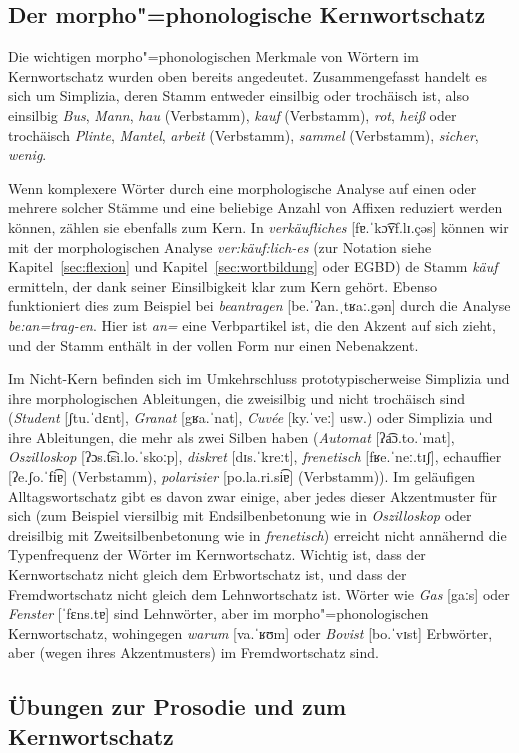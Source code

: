 \subsection{Der morpho"=phonologische Kernwortschatz}

Die wichtigen morpho"=phonologischen Merkmale von Wörtern im Kernwortschatz wurden oben bereits angedeutet.
Zusammengefasst handelt es sich um Simplizia, deren Stamm entweder einsilbig oder trochäisch ist, also einsilbig \textit{Bus}, \textit{Mann}, \textit{hau} (Verbstamm), \textit{kauf} (Verbstamm), \textit{rot}, \textit{heiß} oder trochäisch \textit{Plinte}, \textit{Mantel}, \textit{arbeit} (Verbstamm), \textit{sammel} (Verbstamm), \textit{sicher}, \textit{wenig}.

Wenn komplexere Wörter durch eine morphologische Analyse auf einen oder mehrere solcher Stämme und eine beliebige Anzahl von Affixen reduziert werden können, zählen sie ebenfalls zum Kern.
In \textit{verkäufliches} [fɐ.ˈkɔ͡ʏf.lɪ.çəs] können wir mit der morphologischen Analyse \textit{ver:käuf:lich-es} (zur Notation siehe Kapitel~\ref{sec:flexion} und Kapitel~\ref{sec:wortbildung} oder EGBD) de Stamm \textit{käuf} ermitteln, der dank seiner Einsilbigkeit klar zum Kern gehört.
Ebenso funktioniert dies zum Beispiel bei \textit{beantragen} [be.ˈʔan.ˌtʁaː.gən] durch die Analyse \textit{be:an=trag-en}.
Hier ist \textit{an=} eine Verbpartikel ist, die den Akzent auf sich zieht, und der Stamm enthält in der vollen Form nur einen Nebenakzent.

Im Nicht-Kern befinden sich im Umkehrschluss prototypischerweise Simplizia und ihre morphologischen Ableitungen, die zweisilbig und nicht trochäisch sind (\textit{Student} [ʃtu.ˈdɛnt], \textit{Granat} [gʁa.ˈnat], \textit{Cuvée} [ky.ˈveː] usw.) oder Simplizia und ihre Ableitungen, die mehr als zwei Silben haben (\textit{Automat} [ʔa͡ɔ.to.ˈmat], \textit{Oszilloskop} [ʔɔs.t͡si.lo.ˈskoːp], \textit{diskret} [dɪs.ˈkreːt], \textit{frenetisch} [fʁe.ˈneː.tɪʃ], echauffier [ʔe.ʃo.ˈfi͡ɐ] (Verbstamm), \textit{polarisier} [po.la.ri.si͡ɐ] (Verbstamm)).
Im geläufigen Alltagswortschatz gibt es davon zwar einige, aber jedes dieser Akzentmuster für sich (zum Beispiel viersilbig mit Endsilbenbetonung wie in \textit{Oszilloskop} oder dreisilbig mit Zweitsilbenbetonung wie in \textit{frenetisch}) erreicht nicht annähernd die Typenfrequenz der Wörter im Kernwortschatz.
Wichtig ist, dass der Kernwortschatz nicht gleich dem Erbwortschatz ist, und dass der Fremdwortschatz nicht gleich dem Lehnwortschatz ist.
Wörter wie \textit{Gas} [gaːs] oder \textit{Fenster} [ˈfɛns.tɐ] sind Lehnwörter, aber im  morpho"=phonologischen Kernwortschatz, wohingegen \textit{warum} [va.ˈʁʊm] oder \textit{Bovist} [bo.ˈvɪst] Erbwörter, aber (wegen ihres Akzentmusters) im Fremdwortschatz sind.


\subsection{Übungen zur Prosodie und zum Kernwortschatz}
